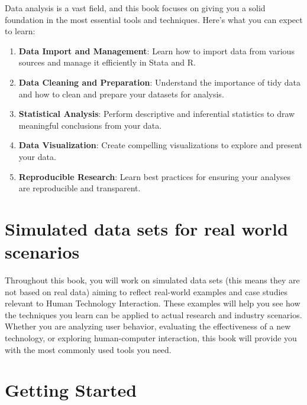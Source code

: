 \documentclass[
  letterpaper,
  DIV=11,
  numbers=noendperiod]{scrreprt}
\providecommand{\tightlist}{%
  \setlength{\itemsep}{0pt}\setlength{\parskip}{0pt}}\usepackage{longtable,booktabs,array}
\begin{document}

Data analysis is a vast field, and this book focuses on giving you a
solid foundation in the most essential tools and techniques. Here's what
you can expect to learn:

\begin{enumerate}
\def\labelenumi{\arabic{enumi}.}
\tightlist
\item
  \textbf{Data Import and Management}: Learn how to import data from
  various sources and manage it efficiently in Stata and R.
\item
  \textbf{Data Cleaning and Preparation}: Understand the importance of
  tidy data and how to clean and prepare your datasets for analysis.
\item
  \textbf{Statistical Analysis}: Perform descriptive and inferential
  statistics to draw meaningful conclusions from your data.
\item
  \textbf{Data Visualization}: Create compelling visualizations to
  explore and present your data.
\item
  \textbf{Reproducible Research}: Learn best practices for ensuring your
  analyses are reproducible and transparent.
\end{enumerate}

\section*{Simulated data sets for real world
scenarios}\label{simulated-data-sets-for-real-world-scenarios}


Throughout this book, you will work on simulated data sets (this means
they are not based on real data) aiming to reflect real-world examples
and case studies relevant to Human Technology Interaction. These
examples will help you see how the techniques you learn can be applied
to actual research and industry scenarios. Whether you are analyzing
user behavior, evaluating the effectiveness of a new technology, or
exploring human-computer interaction, this book will provide you with
the most commonly used tools you need.

\section*{Getting Started}\label{getting-started}
\end{document}
